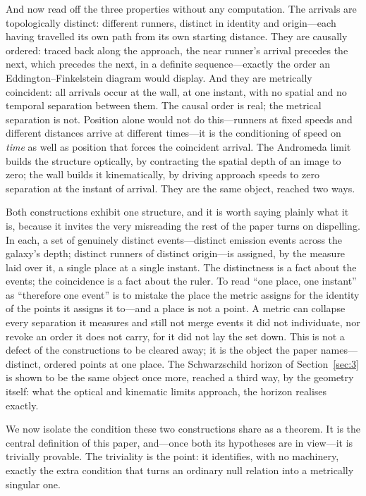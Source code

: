 \documentclass[11pt,a4paper]{article}
\theoremstyle{plain}
\theoremstyle{remark}
\begin{document}
And now read off the three properties without any computation. The arrivals are topologically distinct: different runners, distinct in identity and origin---each having travelled its own path from its own starting distance. They are causally ordered: traced back along the approach, the near runner's arrival precedes the next, which precedes the next, in a definite sequence---exactly the order an Eddington--Finkelstein diagram would display. And they are metrically coincident: all arrivals occur at the wall, at one instant, with no spatial and no temporal separation between them. The causal order is real; the metrical separation is not. Position alone would not do this---runners at fixed speeds and different distances arrive at different times---it is the conditioning of speed on \emph{time} as well as position that forces the coincident arrival. The Andromeda limit builds the structure optically, by contracting the spatial depth of an image to zero; the wall builds it kinematically, by driving approach speeds to zero separation at the instant of arrival. They are the same object, reached two ways.

Both constructions exhibit one structure, and it is worth saying plainly what it is, because it invites the very misreading the rest of the paper turns on dispelling. In each, a set of genuinely distinct events---distinct emission events across the galaxy's depth; distinct runners of distinct origin---is assigned, by the measure laid over it, a single place at a single instant. The distinctness is a fact about the events; the coincidence is a fact about the ruler. To read ``one place, one instant'' as ``therefore one event'' is to mistake the place the metric assigns for the identity of the points it assigns it to---and a place is not a point. A metric can collapse every separation it measures and still not merge events it did not individuate, nor revoke an order it does not carry, for it did not lay the set down. This is not a defect of the constructions to be cleared away; it is the object the paper names---distinct, ordered points at one place. The Schwarzschild horizon of Section~\ref{sec:3} is shown to be the same object once more, reached a third way, by the geometry itself: what the optical and kinematic limits approach, the horizon realises exactly.

We now isolate the condition these two constructions share as a theorem. It is the central definition of this paper, and---once both its hypotheses are in view---it is trivially provable. The triviality is the point: it identifies, with no machinery, exactly the extra condition that turns an ordinary null relation into a metrically singular one.
\end{document}
